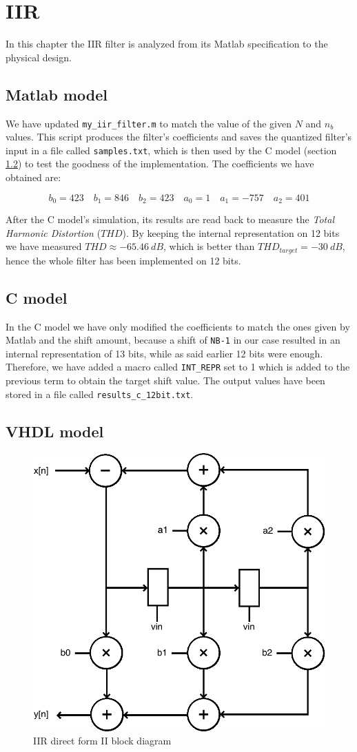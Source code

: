\chapter{IIR}
\label{chap:iir}

In this chapter the IIR filter is analyzed from its Matlab specification to the physical design.

\section{Matlab model}

We have updated \verb|my_iir_filter.m| to match the value of the given $N$ and $n_{b}$ values.
This script produces the filter's coefficients and saves the quantized filter's input in a file called \verb|samples.txt|, which is then used
by the C model (section \ref{sec:iir_c_model}) to test the goodness of the implementation.
The coefficients we have obtained are:

$$b_{0} = 423 \quad b_{1} = 846 \quad b_{2} = 423 \quad a_{0} = 1 \quad a_{1} = -757 \quad a_{2} = 401$$

After the C model's simulation, its results are read back to measure the {\it Total Harmonic Distortion}
($THD$). By keeping the internal representation on 12 bits we have measured $THD \approx -65.46\ dB$, which is
better than $THD_{target} = -30\ dB$, hence the whole filter has been implemented on 12 bits.


\section{C model}
\label{sec:iir_c_model}

In the C model we have only modified the coefficients to match the ones given by Matlab and the shift amount,
because a shift of \verb|NB-1| in our case resulted in an internal representation of 13 bits, while as said
earlier 12 bits were enough. Therefore, we have added a macro called \verb|INT_REPR| set to 1 which is
added to the previous term to obtain the target shift value. The output values have been stored in a file
called \verb|results_c_12bit.txt|.

\section{VHDL model}

\begin{figure}[!ht]
	\centering
	\includegraphics[width=0.4\linewidth]{./chapters/pictures/iir.pdf}
	\caption{IIR direct form II block diagram}
	\label{fig:iir}
\end{figure}

